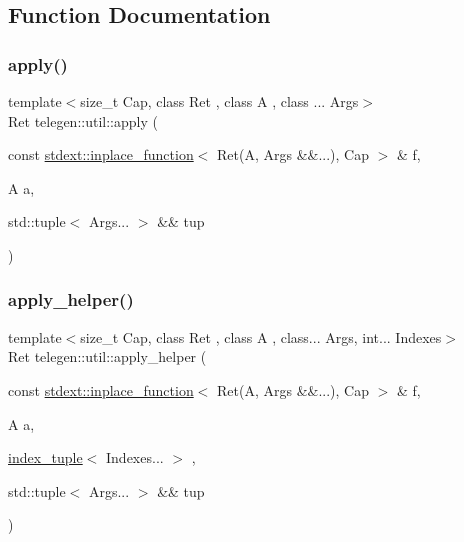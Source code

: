 \subsection{Function Documentation}
\mbox{\label{namespacetelegen_1_1util_a427fe35f9153460a301fe1e84598bfc7}} 
\subsubsection{\texorpdfstring{apply()}{apply()}}
{\footnotesize\ttfamily template$<$size\+\_\+t Cap, class Ret , class A , class ... Args$>$ \\
Ret telegen\+::util\+::apply (\begin{DoxyParamCaption}\item[{const \hyperlink{classstdext_1_1inplace__function}{stdext\+::inplace\+\_\+function}$<$ Ret(A, Args \&\&...), Cap $>$ \&}]{f,  }\item[{A}]{a,  }\item[{std\+::tuple$<$ Args... $>$ \&\&}]{tup }\end{DoxyParamCaption})}

\mbox{\label{namespacetelegen_1_1util_ab05aef37c616f107c1b070178cabb28e}} 
\subsubsection{\texorpdfstring{apply\+\_\+helper()}{apply\_helper()}}
{\footnotesize\ttfamily template$<$size\+\_\+t Cap, class Ret , class A , class... Args, int... Indexes$>$ \\
Ret telegen\+::util\+::apply\+\_\+helper (\begin{DoxyParamCaption}\item[{const \hyperlink{classstdext_1_1inplace__function}{stdext\+::inplace\+\_\+function}$<$ Ret(A, Args \&\&...), Cap $>$ \&}]{f,  }\item[{A}]{a,  }\item[{\hyperlink{structtelegen_1_1util_1_1index__tuple}{index\+\_\+tuple}$<$ Indexes... $>$}]{,  }\item[{std\+::tuple$<$ Args... $>$ \&\&}]{tup }\end{DoxyParamCaption})}


